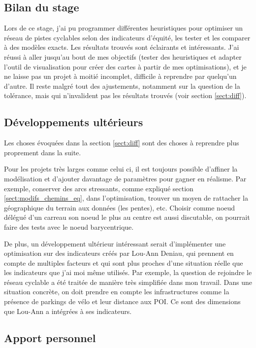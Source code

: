 \subsection{Bilan du stage}

Lors de ce stage, j'ai pu programmer différentes heuristiques pour optimiser un réseau de pistes cyclables selon des indicateurs d'équité, les tester et les comparer à des modèles exacts. Les résultats trouvés sont éclairants et intéressants. J'ai réussi à aller jusqu'au bout de mes objectifs (tester des heuristiques et adapter l'outil de visualisation pour créer des cartes à partir de mes optimisations), et je ne laisse pas un projet à moitié incomplet, difficile à reprendre par quelqu'un d'autre. Il reste malgré tout des ajustements, notamment sur la question de la tolérance, mais qui n'invalident pas les résultats trouvés (voir section \ref{sect:diff}).

\subsection{Développements ultérieurs}

Les choses évoquées dans la section \ref{sect:diff} sont des choses à reprendre plus proprement dans la suite.

Pour les projets très larges comme celui ci, il est toujours possible d'affiner la modélisation et d'ajouter davantage de paramètres pour gagner en réalisme. Par exemple, conserver des arcs stressants, comme expliqué section \ref{sect:modifs_chemins_eq}, dans l'optimisation, trouver un moyen de rattacher la géographique du terrain aux données (les pentes), etc. Choisir comme noeud délégué d'un carreau son noeud le plus au centre est aussi discutable, on pourrait faire des tests avec le noeud barycentrique.  

De plus, un développement ultérieur intéressant serait d'implémenter une optimisation sur des indicateurs créés par Lou-Ann Deniau, qui prennent en compte de multiples facteurs et qui sont plus proches d'une situation réelle que les indicateurs que j'ai moi même utilisés. Par exemple, la question de rejoindre le réseau cyclable a été traitée de manière très simplifiée dans mon travail. Dans une situation concrète, on doit prendre en compte les infrastructures comme la présence de parkings de vélo et leur distance aux POI. Ce sont des dimensions que Lou-Ann a intégrées à ses indicateurs.

\subsection{Apport personnel}

